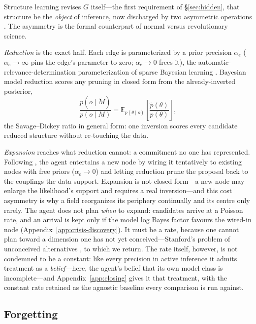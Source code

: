 \documentclass[runningheads]{llncs}
\newcommand{\Eq}[2]{\mathbb{E}_{#1}\!\left[#2\right]}
\begin{document}
Structure learning revises $G$ itself---the first requirement of \S\ref{sec:hidden}, that
structure be the \emph{object} of inference, now discharged by two asymmetric operations
\citep{friston2017curiosity,smith2020structure}. The asymmetry is the formal counterpart of normal
versus revolutionary science.

\emph{Reduction} is the exact half. Each edge is parameterized by a prior precision $\alpha_e$
($\alpha_e\to\infty$ pins the edge's parameter to zero; $\alpha_e\to0$ frees it), the
automatic-relevance-determination parameterization of sparse Bayesian learning
\citep{mackay1992,tipping2001}. Bayesian model reduction \citep{friston2011,friston2018bmr} scores any
pruning in closed form from the already-inverted posterior,
\begin{equation}
\frac{p(o\mid\tilde M)}{p(o\mid M)}=\Eq{p(\theta\mid o)}{\frac{\tilde p(\theta)}{p(\theta)}},
\label{eq:bmr}
\end{equation}
the Savage--Dickey ratio in general form: one inversion scores every candidate reduced structure
without re-touching the data.

\emph{Expansion} reaches what reduction cannot: a commitment no one has represented. Following
\citet{friston2017curiosity}, the agent entertains a new node by wiring it tentatively to existing
nodes with free priors ($\alpha_e\to0$) and letting reduction prune the proposal back to the couplings
the data support. Expansion is not closed-form---a new node may enlarge the
likelihood's support and requires a real inversion---and this cost asymmetry is why a field
reorganizes its periphery continually and its centre only rarely. The agent does not plan \emph{when}
to expand: candidates arrive at a Poisson rate, and an arrival is kept only if the model log Bayes
factor favours the wired-in node (Appendix~\ref{app:crisis-discovery}). It must be a rate,
because one cannot plan toward a dimension one has not yet conceived---Stanford's problem of
unconceived alternatives \citep{stanford2006}, to which we return. The rate itself, however, is
not condemned to be a constant: like every precision in active inference it admits treatment as a
\emph{belief}---here, the agent's belief that its own model class is incomplete---and
Appendix~\ref{app:closing} gives it that treatment, with the constant rate retained as the agnostic
baseline every comparison is run against.

\subsection{Forgetting}
\label{sec:temporal}
\end{document}
